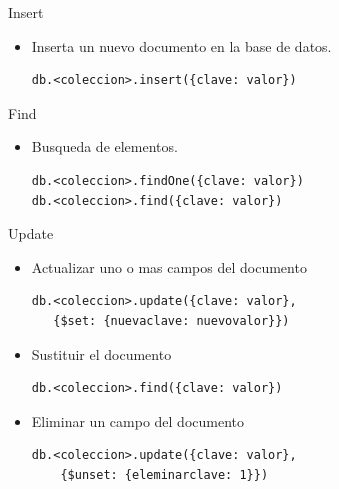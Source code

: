 \documentclass[12pt]{beamer}
\begin{document}
\begin{frame}[fragile]{Insert}
  
  \begin{itemize}
  \item Inserta un nuevo documento en la base de datos.

    \begin{verbatim}
db.<coleccion>.insert({clave: valor})
    \end{verbatim}
    
  \end{itemize}
\end{frame}


\begin{frame}[fragile]{Find}

  \begin{itemize}
  \item Busqueda de elementos.

    \begin{verbatim}
db.<coleccion>.findOne({clave: valor})
db.<coleccion>.find({clave: valor})
    \end{verbatim}
  \end{itemize}
\end{frame}

\renewcommand{\PYZdl}{\textdollar}

\begin{frame}[fragile]{Update}

  \begin{itemize}

    \item Actualizar uno o mas campos del documento
      \begin{verbatim}
db.<coleccion>.update({clave: valor}, 
   {$set: {nuevaclave: nuevovalor}})
         \end{verbatim}

       \item Sustituir el documento 
        \begin{verbatim}
db.<coleccion>.find({clave: valor})
         \end{verbatim}

         \item Eliminar un campo del documento
           \begin{verbatim}
db.<coleccion>.update({clave: valor}, 
    {$unset: {eleminarclave: 1}})
           \end{verbatim}
    
  \end{itemize}
\end{frame}
\end{document}
